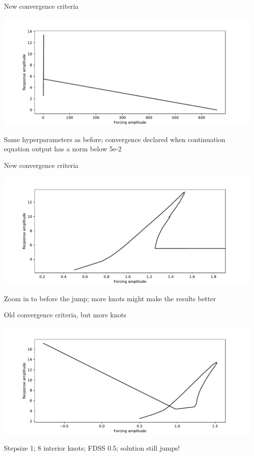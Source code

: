 \documentclass[presentation]{beamer}
\begin{document}
\begin{frame}[label={sec:orgbd896b5}]{New convergence criteria}
\begin{center}
\includegraphics[width=.9\linewidth]{./stepsize1_dsize3_fdss_0d5_fixed_plotting_new_exterior_knots_5e-2solution_norm.pdf}
\end{center}

Same hyperparameters as before; convergence declared when continuation equation output has a norm below 5e-2
\end{frame}


\begin{frame}[label={sec:org9307a19}]{New convergence criteria}
\begin{center}
\includegraphics[width=.9\linewidth]{./stepsize1_dsize3_fdss_0d5_fixed_plotting_new_exterior_knots_5e-2solution_norm_ZOOM.pdf}
\end{center}

Zoom in to before the jump; more knots might make the results better
\end{frame}

\begin{frame}[label={sec:org6c6c3e5}]{Old convergence criteria, but more knots}
\begin{center}
\includegraphics[width=.9\linewidth]{./stepsize1_dsize8_fdss0d5_fixed_plotting_new_exterior_knots.pdf}
\end{center}

Stepsize 1; 8 interior knots; FDSS 0.5; solution still jumps!
\end{frame}
\end{document}
